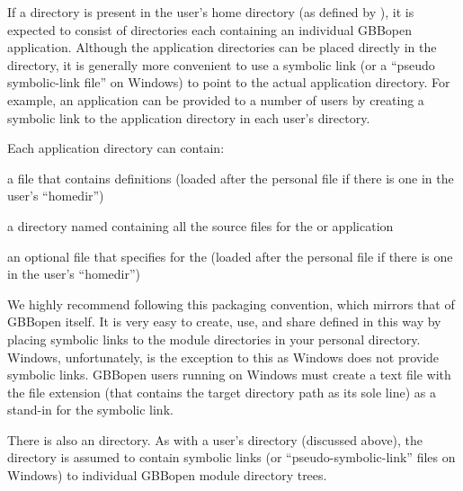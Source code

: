 \documentclass[10pt,twoside,english,pdftex]{article}
\begin{document}
If a  directory is present in the user's home
directory (as defined by ), it is expected to
consist of directories each containing an individual GBBopen application.
Although the application directories can be placed directly in the
 directory, it is generally more convenient to
use a symbolic link (or a ``pseudo symbolic-link file'' on Windows) to point
to the actual application directory.  For example, an application can be
provided to a number of users by creating a symbolic link to the application
directory in each user's  directory.

Each application directory can contain:
%
\begin{tightitemize}
\item a  file that contains  definitions
  (loaded after the personal  file if there is
  one in the user's ``homedir'')
\item a directory named  containing all the source files for the
   or application
\item an optional  file that specifies
   for the  (loaded after the personal
   file if there is one in the user's
  ``homedir'')
\end{tightitemize}

We highly recommend following this packaging convention, which mirrors that of
GBBopen itself. It is very easy to create, use, and share 
defined in this way by placing symbolic links to the module directories in
your personal  directory.  Windows, unfortunately, is
the exception to this as Windows does not provide symbolic links.  GBBopen
users running on Windows must create a text file with the file extension
 (that contains the target directory path as its sole line) as a
stand-in for the symbolic link.

\label{sec:shared-gbbopen-modules-directory}

%
%
%
%
%
There is also an
 directory.
As with a user's  directory (discussed above),
the  directory is assumed to contain
symbolic links (or ``pseudo-symbolic-link'' files on Windows) to individual
GBBopen module directory trees.
\end{document}
